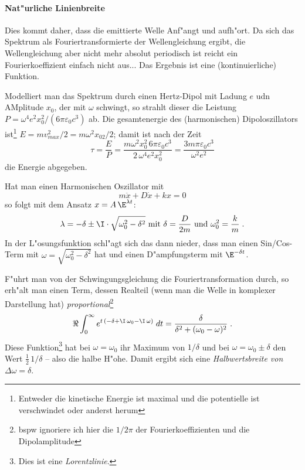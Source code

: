 \documentclass[a4paper,draft]{article}
\begin{document}
\paragraph{Nat"urliche Linienbreite}
\label{sec:naturliche_linienbreite}


Dies kommt daher, dass die emittierte Welle Anf"angt und aufh"ort. Da
sich das Spektrum als Fouriertransformierte der Wellengleichung
ergibt, die Wellengleichung aber nicht mehr absolut periodisch ist
reicht ein Fourierkoeffizient einfach nicht aus... Das Ergebnis ist
eine (kontinuierliche) Funktion.

Modelliert man das Spektrum durch einen Hertz-Dipol mit Ladung $e$ udn
AMplitude $x_0$, der mit $\omega$ schwingt, so strahlt dieser die
Leistung $P = \omega^4 e^2 x_0^2 / (6\pi\varepsilon_0 c^3)$ ab. Die
gesamtenergie des (harmonischen) Dipoloszillators
ist\footnote{Entweder die kinetische Energie ist maximal und die
  potentielle ist verschwindet oder anderst herum} $E = mv_{max}^2/2 =
m\omega^2 x_02 /2$; damit ist nach der Zeit
\begin{equation}
  \label{eq:abklingzeit_dipol}
  \tau = \frac{E}{P} = \frac{m\omega^2x_0^2 \, 6 \pi \varepsilon_0
    c^3}{2 \, \omega^4 e^2 x_0^2}
=
\frac{3m \pi \varepsilon_0 c^3}{\omega^2 e^2} 
\end{equation}
die Energie abgegeben.

Hat man einen Harmonischen Oszillator mit 
\begin{equation*}
  m\ddot x + D \dot x + k x = 0
\end{equation*}
so folgt mit dem Ansatz $x = A \, \E^{\lambda t}$:
\begin{equation*}
  \lambda = -\delta \pm \I \cdot \sqrt{\omega_0^2 - \delta^2} \text{
    mit } \delta = \frac{D}{2m} \text{ und } \omega_0^2 = \frac{k}{m} \;.
\end{equation*}
In der L"osungsfunktion schl"agt sich das dann nieder, dass man einen
Sin/Cos-Term mit $\omega = \sqrt{\omega_0^2 - \delta^2}$ hat und einen
D"ampfungsterm mit $\E^{-\delta t}$. 

F"uhrt man von der Schwingungsgleichung die Fouriertransformation
durch, so erh"alt man einen Term, dessen Realteil (wenn man die Welle
in komplexer Darstellung hat) \emph{proportional}\footnote{bspw
  ignoriere ich hier die $1/2\pi$ der Fourierkoeffizienten und die Dipolamplitude}
\begin{equation*}
  \Re \int_{0}^{\infty }{e^{t\,\left(-\delta+\I\,\omega_0-\I\,\omega\right)}
 \;dt} = 
\frac{\delta}{\delta^2 + (\omega_0 - \omega)^2} \;.
\end{equation*}
Diese Funktion\footnote{Dies ist eine \emph{Lorentzlinie}.} hat bei $\omega = \omega_0$ ihr Maximum von
$1/\delta$ und bei $\omega = \omega_0 \pm \delta$ den Wert
$\frac{1}{2} \, 1/\delta$ -- also die halbe H"ohe. Damit ergibt sich
eine \emph{Halbwertsbreite von $\Delta \omega = \delta$}.
\end{document}
